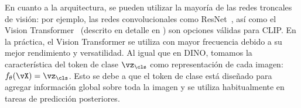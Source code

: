 \documentclass[../../book-main_es.tex]{subfiles}
\begin{document}
En cuanto a la arquitectura, se pueden utilizar la mayoría de las redes troncales de visión: por ejemplo, 
las redes convolucionales como ResNet~\citep{He2016-lc}, así como el Vision Transformer~\citep{dosovitskiy2020image} 
(descrito en detalle en ) son opciones válidas para CLIP. En la práctica, 
el Vision Transformer se utiliza con mayor frecuencia debido a su mejor rendimiento y versatilidad. Al igual que en DINO, 
tomamos la característica del token de clase \(\vz_{\cls}\) como representación de cada imagen: \(f_{\theta}(\vX) = \vz_{\cls}\). 
Esto se debe a que el token de clase está diseñado para agregar información global sobre toda la imagen y se 
utiliza habitualmente en tareas de predicción posteriores.


\end{document}
